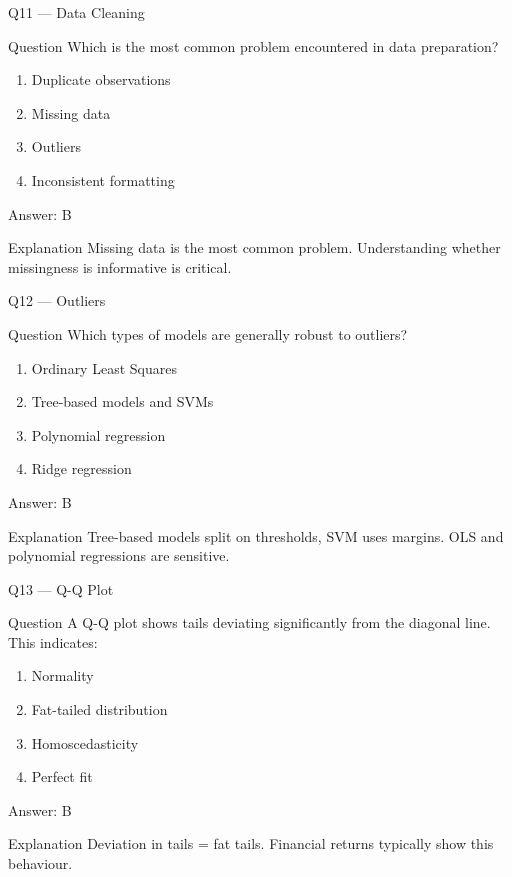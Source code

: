 \documentclass[aspectratio=169,8pt]{beamer}
\begin{document}
	
	\begin{frame}{Q11 --- Data Cleaning}
		\begin{block}{Question}
			Which is the most common problem encountered in data preparation?
		\end{block}
		\begin{enumerate}
			\item Duplicate observations
			\item Missing data
			\item Outliers
			\item Inconsistent formatting
		\end{enumerate}
		\begin{exampleblock}{Answer: B}\end{exampleblock}
		\begin{block}{Explanation}
			Missing data is the most common problem. Understanding whether missingness is informative is critical.
		\end{block}
	\end{frame}
	
	\begin{frame}{Q12 --- Outliers}
		\begin{block}{Question}
			Which types of models are generally robust to outliers?
		\end{block}
		\begin{enumerate}
			\item Ordinary Least Squares
			\item Tree-based models and SVMs
			\item Polynomial regression
			\item Ridge regression
		\end{enumerate}
		\begin{exampleblock}{Answer: B}\end{exampleblock}
		\begin{block}{Explanation}
			Tree-based models split on thresholds, SVM uses margins. OLS and polynomial regressions are sensitive.
		\end{block}
	\end{frame}
	
	\begin{frame}{Q13 --- Q-Q Plot}
		\begin{block}{Question}
			A Q-Q plot shows tails deviating significantly from the diagonal line. This indicates:
		\end{block}
		\begin{enumerate}
			\item Normality
			\item Fat-tailed distribution
			\item Homoscedasticity
			\item Perfect fit
		\end{enumerate}
		\begin{exampleblock}{Answer: B}\end{exampleblock}
		\begin{block}{Explanation}
			Deviation in tails = fat tails. Financial returns typically show this behaviour.
		\end{block}
	\end{frame}
	
\end{document}
